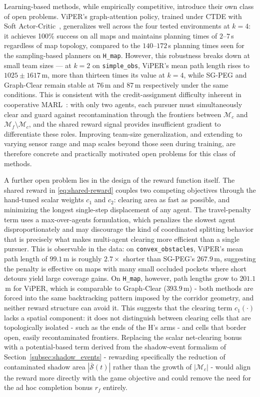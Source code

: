 \documentclass[conference]{IEEEtran}
\begin{document}
Learning-based methods, while empirically competitive, introduce their own class of open problems.
ViPER's graph-attention policy, trained under CTDE with Soft Actor-Critic~\cite{haarnoja2018soft}, generalizes well across the four tested environments at $k=4$: it achieves 100\% success on all maps and maintains planning times of $2$--$7$\,s regardless of map topology, compared to the $140$--$172$\,s planning times seen for the sampling-based planners on \texttt{H\_map}.
However, this robustness breaks down at small team sizes --- at $k=2$ on \texttt{simple\_obs}, ViPER's mean path length rises to $1025 \pm 1617$\,m, more than thirteen times its value at $k=4$, while SG-PEG and Graph-Clear remain stable at $76$\,m and $87$\,m respectively under the same conditions.
This is consistent with the credit-assignment difficulty inherent in cooperative MARL~\cite{busoniu2008comprehensive}: with only two agents, each pursuer must simultaneously clear and guard against recontamination through the frontiers between $\mathcal{M}_c$ and $\mathcal{M}_f\setminus\mathcal{M}_c$, and the shared reward signal provides insufficient gradient to differentiate these roles.
Improving team-size generalization, and extending to varying sensor range and map scales beyond those seen during training, are therefore concrete and practically motivated open problems for this class of methods.

A further open problem lies in the design of the reward function itself.
The shared reward in \eqref{eq:shared-reward}
couples two competing objectives through the hand-tuned scalar weights $c_1$ and $c_2$: clearing area as fast as possible, and minimizing the longest single-step displacement of any agent.
The travel-penalty term uses a max-over-agents formulation, which penalizes the slowest agent disproportionately and may discourage the kind of coordinated splitting behavior that is precisely what makes multi-agent clearing more efficient than a single pursuer.
This is observable in the data: on \texttt{convex\_obstacles}, ViPER's mean path length of $99.1$\,m is roughly $2.7\times$ shorter than SG-PEG's $267.9$\,m, suggesting the penalty is effective on maps with many small occluded pockets where short detours yield large coverage gains.
On \texttt{H\_map}, however, path lengths grow to $201.1$\,m for ViPER, which is comparable to Graph-Clear ($393.9$\,m) - both methods are forced into the same backtracking pattern imposed by the corridor geometry, and neither reward structure can avoid it.
This suggests that the clearing term $c_1(\cdot)$ lacks a spatial component: it does not distinguish between clearing cells that are topologically isolated - such as the ends of the H's arms - and cells that border open, easily recontaminated frontiers.
Replacing the scalar net-clearing bonus with a potential-based term derived from the shadow-event formalism of Section~\ref{subsec:shadow_events} - rewarding specifically the reduction of contaminated shadow area $|\mathcal{\bar{S}}(t)|$ rather than the growth of $|\mathcal{M}_c|$ - would align the reward more directly with the game objective and could remove the need for the ad hoc completion bonus $r_f$ entirely.
\end{document}
